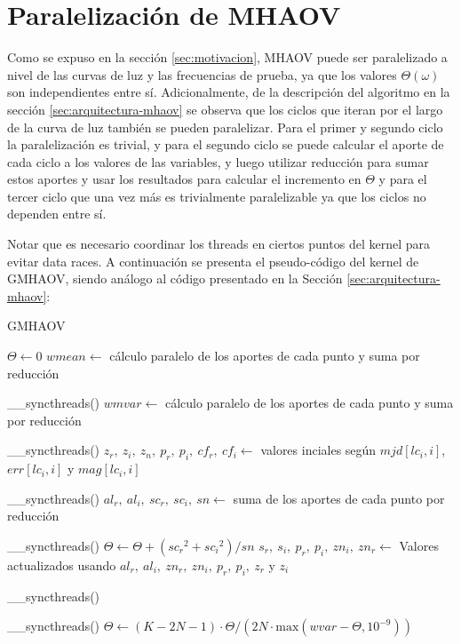 \section{Paralelización de MHAOV}\label{sec:paralelización}
Como se expuso en la sección \ref{sec:motivacion}, MHAOV puede ser paralelizado a nivel de las curvas de luz y las frecuencias de prueba, ya que los valores $\Theta(\omega)$ son independientes entre sí. Adicionalmente, de la descripción del algoritmo en la sección \ref{sec:arquitectura-mhaov} se observa que los ciclos que iteran por el largo de la curva de luz también se pueden paralelizar. Para el primer y segundo ciclo la paralelización es trivial, y para el segundo ciclo se puede calcular el aporte de cada ciclo a los valores de las variables, y luego utilizar reducción para sumar estos aportes y usar los resultados para calcular el incremento en $\Theta$ y para el tercer ciclo que una vez más es trivialmente paralelizable ya que los ciclos no dependen entre sí.

Notar que es necesario coordinar los threads en ciertos puntos del kernel para evitar data races. A continuación se presenta el pseudo-código del kernel de GMHAOV, siendo análogo al código presentado en la Sección \ref{sec:arquitectura-mhaov}:

\begin{algorithm}[H]
\caption{GMHAOV}\label{alg:gmhaov}
\begin{algorithmic}
        \State $\Theta \gets 0$
    \EndIf
    \State $wmean \gets$ cálculo paralelo de los aportes de cada punto y suma por reducción 

    \_\_syncthreads()
    \State $wmvar \gets$ cálculo paralelo de los aportes de cada punto y suma por reducción 

    \_\_syncthreads()
    \State $z_r, \ z_i, \ z_n, \ p_r, \ p_i, \ cf_r, \ cf_i \gets$ valores inciales según $mjd[lc_i, i]$, $err[lc_i, i]$ y $mag[lc_i, i]$

    \_\_syncthreads()
        \State $al_r, \ al_i, \ sc_r, \ sc_i, \ sn \gets$ suma de los aportes de cada punto por reducción

    \_\_syncthreads()
            \State $\Theta \gets \Theta + ({sc_r}^{2} + {sc_i}^{2})/sn$
        \EndIf
        \State $s_r, \ s_i, \ p_r, \ p_i, \ zn_i, \ zn_r \gets$ Valores actualizados usando $al_r, \ al_i, \ zn_r, \ zn_i, \ p_r, \ p_i, \ z_r$ y  $z_i$

    \_\_syncthreads()
    \EndFor

    \_\_syncthreads()
\State  $\Theta \gets (K-2N-1)\cdot \Theta / (2N\cdot \text{max}(wvar - \Theta, 10^{-9}))$
    \EndFunction
\end{algorithmic}
\end{algorithm}

